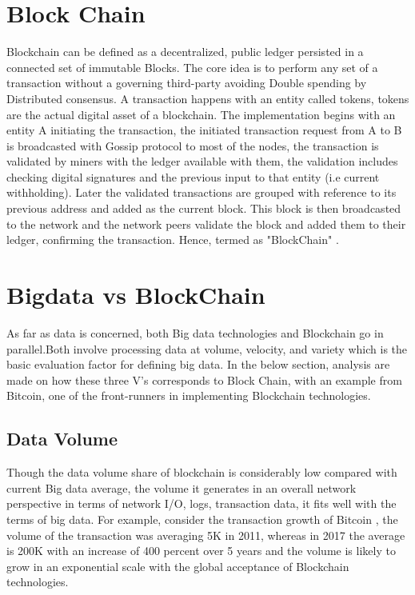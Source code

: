 \documentclass[sigconf]{acmart}
\begin{document}
\section{Block Chain}
  Blockchain can be defined as a decentralized, public ledger persisted in a connected set of immutable Blocks. The core idea is to perform any set of a transaction without a governing third-party avoiding Double spending by Distributed consensus. A transaction happens with an entity called tokens, tokens are the actual digital asset of a blockchain. The implementation begins with an entity A initiating the transaction, the initiated transaction request from A to B is broadcasted with Gossip protocol to most of the nodes, the transaction is validated by miners with the ledger available with them, the validation includes checking digital signatures and the previous input to that entity (i.e current withholding). Later the validated transactions are grouped with reference to its previous address and added as the current block. This block is then broadcasted to the network and the network peers validate the block and added them to their ledger, confirming the transaction. Hence, termed as "BlockChain" \cite{Bitcoin}. 
  
\section{Bigdata vs BlockChain}
As far as data is concerned, both Big data technologies and Blockchain go in parallel.Both involve processing data at volume, velocity, and variety which is the basic evaluation factor for defining big data. In the below section, analysis are made on how these three V's corresponds to Block Chain, with an example from Bitcoin, one of the front-runners in implementing Blockchain technologies.

\subsection{Data Volume}
Though the data volume share of blockchain is considerably low compared with current Big data average, the volume it generates in an overall network perspective in terms of network I/O, logs, transaction data, it fits well with the terms of big data. For example, consider the transaction growth of Bitcoin \cite{bitcointrans}, the volume of the transaction was averaging 5K in 2011, whereas in 2017 the average is 200K with an increase of 400 percent over 5 years and the volume is likely to grow in an exponential scale with the global acceptance of Blockchain technologies. 
\end{document}
